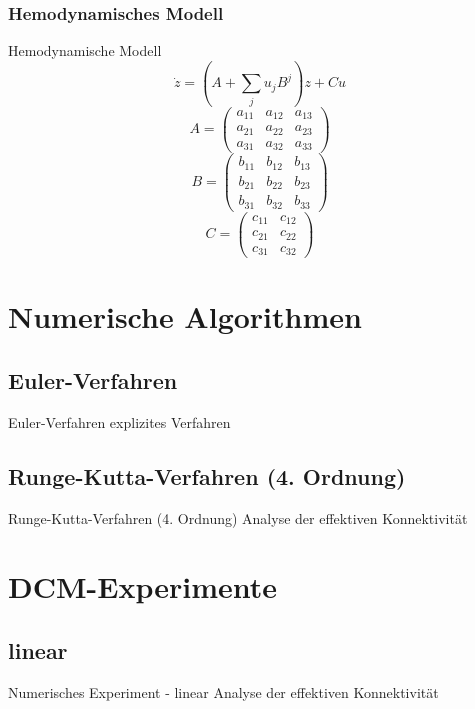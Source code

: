 \documentclass{beamer}
\begin{document}
	\subsubsection{Hemodynamisches Modell}
	\begin{frame}{Hemodynamische Modell}
		\[\dot{z}=(A+\sum_{j}u_jB^j)z+Cu\]
		  \[
		 A=\left(\begin{array}{ccc} 
		  a_{11} &  a_{12} & a_{13} \\a_{21} &  a_{22} & a_{23} \\a_{31} &  a_{32} & a_{33}
		  \end{array}\right) 
		  \]
		  \[
		  B=\left(\begin{array}{ccc} 
		  b_{11} &  b_{12} & b_{13} \\b_{21} &  b_{22} & b_{23} \\b_{31} &  b_{32} & b_{33}
		  \end{array}\right) 
		  \]
		  \[
		  C=\left(\begin{array}{cc} 
		  c_{11} &  c_{12} \\c_{21} &  c_{22} \\c_{31} &  c_{32} 
		  \end{array}\right) 
		  \]
	\end{frame}

\section{Numerische Algorithmen}
\subsection{Euler-Verfahren}
	\begin{frame}{Euler-Verfahren}
		explizites Verfahren
	\end{frame}
	
\subsection{Runge-Kutta-Verfahren (4. Ordnung)}
	\begin{frame}{Runge-Kutta-Verfahren (4. Ordnung)}
		Analyse der effektiven Konnektivität
	\end{frame}

\section{DCM-Experimente}
\subsection{linear}
	\begin{frame}{Numerisches Experiment - linear}
		Analyse der effektiven Konnektivität
	\end{frame}
\end{document}
